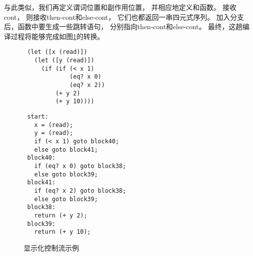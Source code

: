与此类似，我们再定义谓词位置和副作用位置，
并相应地定义和函数。
接收cont，
则接收then-cont和else-cont，
它们也都返回一串四元式序列。
加入分支后，函数中要生成一些跳转语句，
分别指向then-cont和else-cont。
最终，这趟编译过程将能够完成如图\ref{fig:explicate-control-eg}的转换。


\begin{figure}
\begin{transformation}
\begin{lstlisting}
 (let ([x (read)])
   (let ([y (read)])
     (if (if (< x 1)
             (eq? x 0)
             (eq? x 2))
         (+ y 2)
         (+ y 10))))
\end{lstlisting}
\compilesto
\begin{lstlisting}
 start:
   x = (read);
   y = (read);
   if (< x 1) goto block40;
   else goto block41;
 block40:
   if (eq? x 0) goto block38;
   else goto block39;
 block41:
   if (eq? x 2) goto block38;
   else goto block39;
 block38:
   return (+ y 2);
 block39:
   return (+ y 10);
\end{lstlisting}
\end{transformation}
    \caption{显示化控制流示例}
    \label{fig:explicate-control-eg}
\end{figure}
